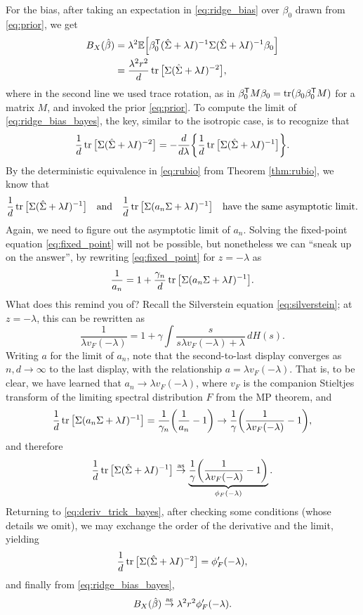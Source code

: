 \documentclass{article}
\begin{document}
For the bias, after taking an expectation in \eqref{eq:ridge_bias} over
$\beta_0$ drawn from \eqref{eq:prior}, we get
\begin{align}
\nonumber
B_X(\hat{\beta}) 
&= \lambda^2 \mathbb{E} \Big[ \beta_0^{\mathsf{T}} (\hat\Sigma + \lambda I)^{-1} \Sigma (\hat\Sigma + 
  \lambda I)^{-1} \beta_0 \Big] \\
\label{eq:ridge_bias_bayes}
&= \frac{\lambda^2 r^2}{d} \operatorname{tr} \big[ \Sigma (\hat\Sigma + \lambda I)^{-2} \big],
\end{align}
where in the second line we used trace rotation, as in $\beta_0^{\mathsf{T}} M \beta_0 = 
\operatorname{tr}(\beta_0 \beta_0^{\mathsf{T}} M)$ for a matrix $M$, and invoked the prior
\eqref{eq:prior}. To compute the limit of \eqref{eq:ridge_bias_bayes}, the key,
similar to the isotropic case, is to recognize that   
\begin{equation}
\label{eq:deriv_trick_bayes}
\frac{1}{d} \operatorname{tr} \big[ \Sigma (\hat\Sigma + \lambda I)^{-2} \big] = -
\frac{d}{d\lambda} \bigg \{ \frac{1}{d} \operatorname{tr} \big[ \Sigma (\hat\Sigma + \lambda  
I)^{-1} \big] \bigg\}.   
\end{equation}
By the deterministic equivalence in \eqref{eq:rubio} from Theorem
\ref{thm:rubio}, we know that
\[
\frac{1}{d} \operatorname{tr} \big[ \Sigma (\hat\Sigma + \lambda I)^{-1} \big] \quad \text{and}
\quad \frac{1}{d} \operatorname{tr} \big[\Sigma (a_n \Sigma + \lambda I)^{-1} \big] \quad
\text{have the same asymptotic limit}.
\]
Again, we need to figure out the asymptotic limit of $a_n$. Solving the
fixed-point equation \eqref{eq:fixed_point} will not be possible, but
nonetheless we can ``sneak up on the answer'', by rewriting
\eqref{eq:fixed_point} for $z = -\lambda$ as
\[
\frac{1}{a_n}  = 1 + \frac{\gamma_n}{d} \operatorname{tr} \big[ \Sigma (a_n \Sigma + \lambda 
I)^{-1} \big]. 
\]
What does this remind you of? Recall the Silverstein equation
\eqref{eq:silverstein}; at $z = -\lambda$, this can be rewritten as     
\[
\frac{1}{\lambda v_F(-\lambda)} = 1 + \gamma \int \frac{s}{s \lambda
  v_F(-\lambda) + \lambda} \, dH(s). 
\]
Writing $a$ for the limit of $a_n$, note that the second-to-last display
converges as $n,d \to \infty$ to the last display, with the relationship $a =
\lambda v_F(-\lambda)$. That is, to be clear, we have learned that $a_n \to
\lambda v_F(-\lambda)$, where $v_F$ is the companion Stieltjes transform of the
limiting spectral distribution $F$ from the MP theorem, and 
\[
\frac{1}{d} \operatorname{tr} \big[ \Sigma (a_n \Sigma + \lambda I)^{-1} \big] =
\frac{1}{\gamma_n} \bigg( \frac{1}{a_n} - 1 \bigg) \to \frac{1}{\gamma} 
\bigg( \frac{1}{\lambda v_F(-\lambda)} - 1 \bigg),
\]
and therefore 
\[
\frac{1}{d} \operatorname{tr} \big[ \Sigma (\hat\Sigma + \lambda I)^{-1} \big] \overset{\mathrm{as}}{\to}
\underbrace{\frac{1}{\gamma} \bigg( \frac{1}{\lambda v_F(-\lambda)} - 1   
  \bigg)}_{\phi_F(-\lambda)}. 
\]
Returning to \eqref{eq:deriv_trick_bayes}, after checking some conditions (whose 
details we omit), we may exchange the order of the derivative and the limit,
yielding  
\[
\frac{1}{d} \operatorname{tr} \big[ \Sigma (\hat\Sigma + \lambda I)^{-2} \big] =
\phi'_F(-\lambda),
\]
and finally from \eqref{eq:ridge_bias_bayes}, 
\begin{equation}
\label{eq:ridge_bias_bayes_limit}
B_X(\hat{\beta}) \overset{\mathrm{as}}{\to} \lambda^2 r^2 \phi'_F(-\lambda). 
\end{equation}
\end{document}
